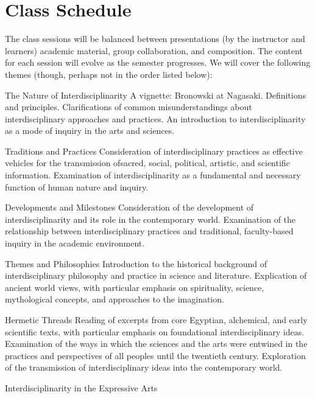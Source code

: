 \documentclass[10pt,DIV09,letterpaper,oneside,headsepline]{scrreprt}
\begin{document}
\section{Class Schedule}
The class sessions will be balanced between presentations (by the instructor and learners) academic material, group collaboration, and composition. The content for each session will evolve as the semester progresses. We will cover the following themes (though, perhaps not in the order listed below):
\\
\begin{compactdesc}

\item[The Nature of Interdisciplinarity]
A vignette: Bronowski at Nagasaki.
Definitions and principles.
Clarifications of common misunderstandings about interdisciplinary approaches and practices.
An introduction to interdisciplinarity as a mode of inquiry in the arts and sciences.
\\
\item[Traditions and Practices]
Consideration of interdisciplinary practices as effective vehicles for the transmission ofsacred, social, political, artistic, and scientific information.
Examination of interdisciplinarity as a fundamental and necessary function of human nature and inquiry.
\\
\item[Developments and Milestones]
Consideration of the development of interdisciplinarity and its role in the contemporary world.
Examination of the relationship between interdisciplinary practices and traditional, faculty-based inquiry in the academic environment.
\\	
\item[Themes and Philosophies]
Introduction to the historical background of interdisciplinary philosophy and practice in science and literature.
Explication of ancient world views, with particular emphasis on spirituality, science, mythological concepts, and approaches to the imagination.
\\
\item[Hermetic Threads]
Reading of excerpts from core Egyptian, alchemical, and early scientific texts, with particular emphasis on foundational interdisciplinary ideas.
Examination of the ways in which the sciences and the arts were entwined in the practices and perspectives of all peoples until the twentieth century.
Exploration of the transmission of interdisciplinary ideas into the contemporary world.
\\
\item[Interdisciplinarity in the Expressive Arts]

\end{compactdesc}
\end{document}
